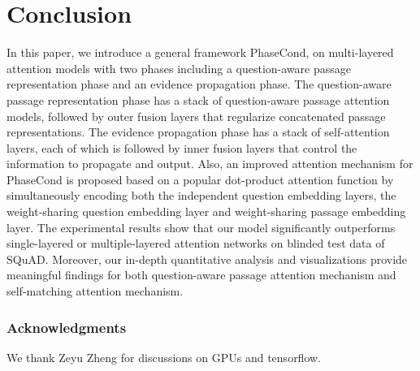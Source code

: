 \documentclass{article} \usepackage{arxiv, times}
\begin{document}
 \section{Conclusion}
In this paper, we introduce a general framework PhaseCond, on multi-layered attention models with two phases including a question-aware passage representation phase and an evidence propagation phase. The question-aware passage representation phase has a stack of question-aware passage attention models, followed by outer fusion layers that regularize concatenated passage representations. The evidence propagation phase has a stack of self-attention layers, each of which is followed by inner fusion layers that control the information to propagate and output. Also, an improved attention mechanism for PhaseCond is proposed based on a popular dot-product attention function by simultaneously encoding both the independent question embedding layers, the weight-sharing question embedding layer and weight-sharing passage embedding layer.
The experimental results show that our model significantly outperforms single-layered or multiple-layered attention networks on blinded test data of SQuAD. Moreover, our in-depth quantitative analysis and visualizations provide meaningful findings for both question-aware passage attention mechanism and self-matching attention mechanism. \subsubsection*{Acknowledgments}
We thank Zeyu Zheng for discussions on GPUs and tensorflow.
 


\end{document}
